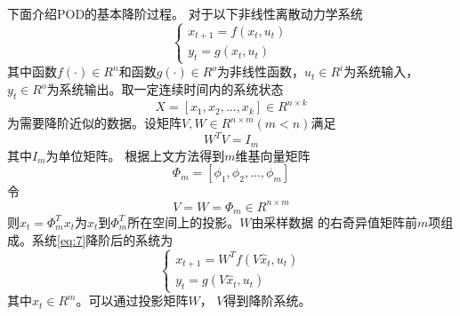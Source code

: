 下面介绍POD的基本降阶过程。
对于以下非线性离散动力学系统
\begin{equation}
\label{eq:7}
\left\{ \begin{array}{l}
  {x_{t + 1}} = f({x_t},{u_t})\\
  {y_t} = g({x_t},{u_t})
  \end{array} \right.
\end{equation}
其中函数$f( \cdot ) \in {{R}^n}$和函数$g( \cdot ) \in {{R}^o}$为非线性函数，${u_t} \in {{R}^i}$为系统输入，${y_t} \in {{R}^o}$为系统输出。取一定连续时间内的系统状态
\begin{equation}
\label{eq:8}
X = [{x_1},{x_2},...,{x_k}]  \in {R}^{n \times k}
\end{equation}
为需要降阶近似的数据。设矩阵$V,W \in {{R}^{n \times m}}$$(m<n)$满足
\begin{equation}
\label{eq:9}
{W^T}V = {I_m}  
\end{equation}
其中$I_m$为单位矩阵。
根据上文方法得到$m$维基向量矩阵
\begin{equation}
\label{eq:10}
{\varPhi  _m} = [{\phi _1},{\phi _2},...,{\phi _m}]
\end{equation}
令
\begin{equation}
\label{eq:11}
V = W = {\varPhi  _m} \in {{{R}}^{n \times m}}
\end{equation}
则${\hat x_t} = \varPhi  _m^T{x_t}$为${x_t}$到$\varPhi  _m^T$所在空间上的投影。$W$由采样数据 的右奇异值矩阵前$m$项组成。系统\ref{eq:7}降阶后的系统为
\begin{equation}
\label{eq:12} 
\left\{ \begin{array}{l}
  {x_{t + 1}} = {W^T}f(V{{\hat x}_t},{u_t})\\
  {y_t} = g(V{{\hat x}_t},{u_t})
  \end{array} \right.
\end{equation}
其中${\hat x_t} \in {{R}^m}$。可以通过投影矩阵$W$， $V$得到降阶系统。
